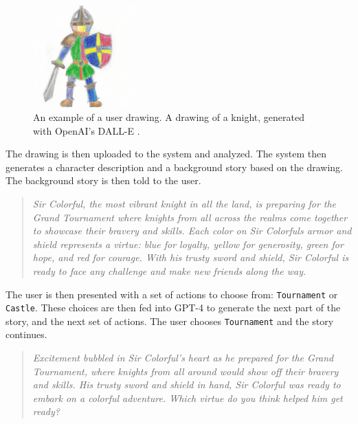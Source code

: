 \documentclass[submit,techrep,english]{ipsj}
\begin{document}
\begin{figure}
    \centering
    \includegraphics[width=0.35\textwidth]{figures/knight.png}
    \caption{An example of a user drawing. A drawing of a knight, generated with OpenAI's DALL-E \cite{22:dalle}.}
    \label{fig:knight}
\end{figure}

The drawing is then uploaded to the system and analyzed. The system then generates a character description and a background story based on the drawing. The background story is then told to the user.

\vspace{10pt} %

\begin{quote}
    \textit{Sir Colorful, the most vibrant knight in all the land, is preparing for the Grand Tournament where knights from all across the realms come together to showcase their bravery and skills. Each color on Sir Colorfuls armor and shield represents a virtue: blue for loyalty, yellow for generosity, green for hope, and red for courage. With his trusty sword and shield, Sir Colorful is ready to face any challenge and make new friends along the way.}
\end{quote}

\vspace{10pt} %

The user is then presented with a set of actions to choose from: \verb|Tournament| or \verb|Castle|. These choices are then fed into GPT-4 to generate the next part of the story, and the next set of actions. The user chooses \verb|Tournament| and the story continues.

\vspace{10pt} %

\begin{quote}
    \textit{Excitement bubbled in Sir Colorful's heart as he prepared for the Grand Tournament, where knights from all around would show off their bravery and skills. His trusty sword and shield in hand, Sir Colorful was ready to embark on a colorful adventure. Which virtue do you think helped him get ready?}
\end{quote}
\end{document}
